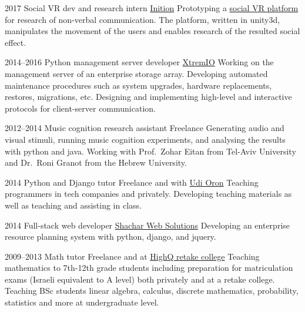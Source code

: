 \documentclass[]{friggeri-cv}
\begin{document}
\begin{entrylist}

    \entry
    {2017}
    {Social VR dev and research intern}
    {\href{https://www.inition.co.uk/}{Inition}}
    {
      Prototyping a \href{https://github.com/Nagasaki45/UnsocialVR/}{social VR platform} for research of non-verbal communication. The platform, written in unity3d, manipulates the movement of the users and enables research of the resulted social effect.
    }

\end{entrylist}
\begin{entrylist}

    \entry
    {2014--2016}
    {Python management server developer}
    {\href{http://xtremio.com/}{XtremIO}}
    {
      Working on the management server of an enterprise storage array.
      Developing automated maintenance procedures such as system upgrades, hardware replacements, restores, migrations, etc.
      Designing and implementing high-level and interactive protocols for client-server communication.
    }

\end{entrylist}
\begin{entrylist}

    \entry
    {2012--2014}
    {Music cognition research assistant}
    {Freelance}
    {
      Generating audio and visual stimuli, running music cognition experiments, and analysing the results with python and java.
      Working with Prof.\ Zohar Eitan from Tel-Aviv University and Dr.\ Roni Granot from the Hebrew University.
    }

\end{entrylist}
\begin{entrylist}

    \entry
    {2014}
    {Python and Django tutor}
    {Freelance and with \href{http://www.10x.org.il/}{Udi Oron}}
    {
      Teaching programmers in tech companies and privately.
      Developing teaching materials as well as teaching and assisting in class.
    }

\end{entrylist}
\begin{entrylist}

    \entry
    {2014}
    {Full-stack web developer}
    {\href{http://www.shachar-web.co.il/eng/}{Shachar Web Solutions}}
    {
      Developing an enterprise resource planning system with python, django, and jquery.
    }

\end{entrylist}
\begin{entrylist}

    \entry
    {2009--2013}
    {Math tutor}
    {Freelance and at \href{https://www.high-q.co.il/}{HighQ retake college}}
    {
      Teaching mathematics to 7th-12th grade students including preparation for matriculation exams (Israeli equivalent to A level) both privately and at a retake college.
      Teaching BSc students linear algebra, calculus, discrete mathematics, probability, statistics and more at undergraduate level.
    }

\end{entrylist}
\end{document}
